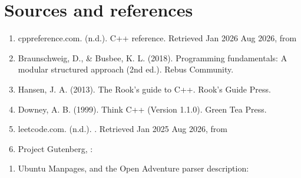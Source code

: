 \documentclass[letterpaper,10pt,english]{sphinxmanual}
\begin{document}
\section{Sources and references}
\label{\detokenize{AssignmentFour/main:sources-and-references}}\begin{enumerate}
%
\item {} 
\sphinxAtStartPar
cppreference.com. (n.d.). C++ reference. Retrieved Jan 2026 \sphinxhyphen{} Aug 2026, from 

\item {} 
\sphinxAtStartPar
Braunschweig, D., \& Busbee, K. L. (2018). Programming fundamentals: A modular structured approach (2nd ed.). Rebus Community. 

\item {} 
\sphinxAtStartPar
Hansen, J. A. (2013). The Rook’s guide to C++. Rook’s Guide Press. 

\item {} 
\sphinxAtStartPar
Downey, A. B. (1999). Think C++ (Version 1.1.0). Green Tea Press. 

\item {} 
\sphinxAtStartPar
leetcode.com. (n.d.). . Retrieved Jan 2025 \sphinxhyphen{} Aug 2026, from 

\item {} 
\sphinxAtStartPar
Project Gutenberg, :

\end{enumerate}
\begin{quote}

\sphinxAtStartPar
{}
\end{quote}
\begin{enumerate}
%
\item {} 
\sphinxAtStartPar
Ubuntu Manpages,  and the Open Adventure parser description:

\end{enumerate}
\begin{quote}

\sphinxAtStartPar
{}
\end{quote}
\end{document}
